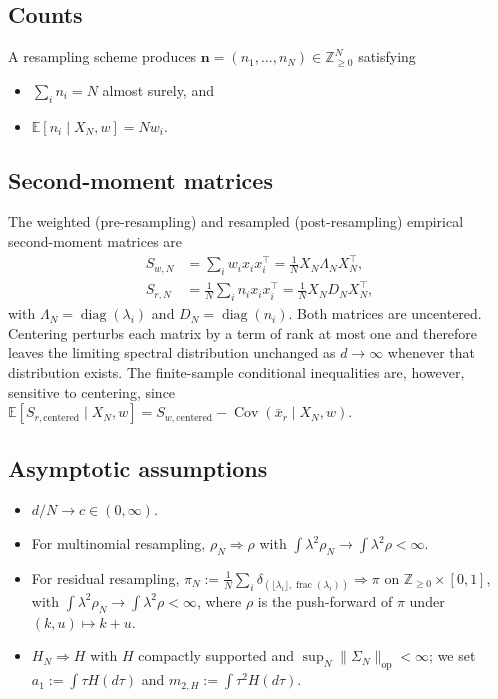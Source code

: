 \documentclass[lettersize,journal]{IEEEtran}
\theoremstyle{remark}
\begin{document}
\subsection{Counts}

A resampling scheme produces $\bm{n}=(n_1,\dots,n_N)\in\mathbb{Z}_{\ge0}^N$
satisfying
\begin{itemize}
  \item[(A1)] $\sum_in_i=N$ almost surely, and
  \item[(A2)] $\mathbb{E}[n_i\mid X_N,w]=Nw_i$.
\end{itemize}

\subsection{Second-moment matrices}

The weighted (pre-resampling) and resampled (post-resampling) empirical
second-moment matrices are
\begin{align}
  S_{w,N}&=\sum_iw_ix_ix_i^\top=\tfrac1N X_N\Lambda_NX_N^\top,\nonumber\\
  S_{r,N}&=\tfrac1N\sum_in_ix_ix_i^\top=\tfrac1N X_ND_NX_N^\top,\nonumber
\end{align}
with $\Lambda_N=\operatorname{diag}(\lambda_i)$ and
$D_N=\operatorname{diag}(n_i)$. Both matrices are uncentered. Centering
perturbs each matrix by a term of rank at most one and therefore leaves the
limiting spectral distribution unchanged as $d\to\infty$ whenever that
distribution exists. The finite-sample conditional inequalities are, however,
sensitive to centering, since
$\mathbb{E}[S_{r,\mathrm{centered}}\mid X_N,w]
=S_{w,\mathrm{centered}}-\operatorname{Cov}(\bar{x}_r\mid X_N,w)$.

\subsection{Asymptotic assumptions}

\begin{itemize}
  \item[(A3)] $d/N\to c\in(0,\infty)$.
  \item[(A4)] For multinomial resampling, $\rho_N\Rightarrow\rho$ with
    $\int\lambda^2\rho_N\to\int\lambda^2\rho<\infty$.
  \item[(A4R)] For residual resampling,
    $\pi_N:=\frac1N\sum_i\delta_{(\lfloor\lambda_i\rfloor,
    \operatorname{frac}(\lambda_i))}\Rightarrow\pi$ on
    $\mathbb{Z}_{\ge0}\times[0,1]$, with
    $\int\lambda^2\rho_N\to\int\lambda^2\rho<\infty$, where $\rho$ is the
    push-forward of $\pi$ under $(k,u)\mapsto k+u$.
  \item[(A5)] $H_N\Rightarrow H$ with $H$ compactly supported and
    $\sup_N\|\Sigma_N\|_{\mathrm{op}}<\infty$; we set
    $a_1:=\int\tau H(d\tau)$ and $m_{2,H}:=\int\tau^2H(d\tau)$.
\end{itemize}
\end{document}
